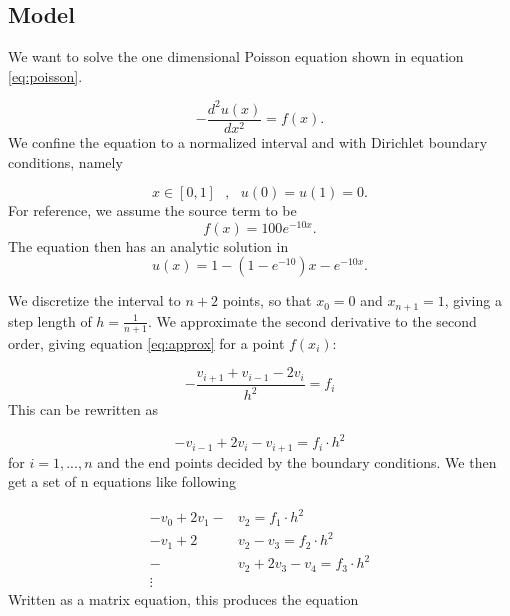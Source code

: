\documentclass{emulateapj}
\begin{document}
\subsection{Model}
We want to solve the one dimensional Poisson equation shown in equation \ref{eq:poisson}.

\begin{equation} \label{eq:poisson}
    -\frac{d^2u(x)}{dx^2} = f(x).
\end{equation}
We confine the equation to a normalized interval and with Dirichlet boundary conditions, namely

\begin{equation} \label{eq:conditions}
    x \in [0,1]\text{   } , \text{   } u(0) = u(1) = 0.
\end{equation}
For reference, we assume the source term to be
\begin{equation} \label{eq:fofx}
    f(x) = 100e^{-10x}.
\end{equation}
The equation then has an analytic solution in
\begin{equation} \label{eq:analytic}
    u(x) =1 - \left(1-e^{-10}\right)x - e^{-10x}.
\end{equation}

We discretize the interval to $n+2$ points, so that $x_0 = 0$ and $x_{n+1} = 1$, giving a step length of $h = \frac{1}{n+1}$. We approximate the second derivative to the second order, giving equation \ref{eq:approx} for a point $f(x_i)$:

\begin{equation} \label{eq:approx}
    - \frac{v_{i+1} + v_{i-1} - 2v_{i}}{h^2} = f_i
\end{equation}
This can be rewritten as

\begin{equation}
    -v_{i-1} + 2v_{i} - v_{i+1} = f_i \cdot h^2
\end{equation}
for $i=1,...,n$ and the end points decided by the boundary conditions. We then get a set of n equations like following

\begin{align*}
    - v_{0} + 2v_{1} - &v_{2} = f_1 \cdot h^2 \\
    - v_{1} + 2&v_{2} - v_{3} = f_2 \cdot h^2 \\
    - &v_{2} + 2v_{3} - v_{4} = f_3 \cdot h^2 \\
    \vdots
\end{align*}
Written as a matrix equation, this produces the equation
\end{document}
